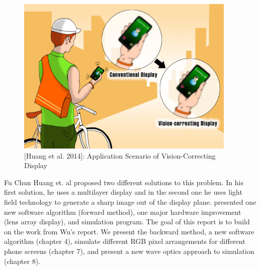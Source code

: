 \begin{figure}[ht]
  \centering
  \includegraphics[height=3in]{chapters/chapter1/images/phone.jpg}
  \caption{[Huang et al. 2014]: Application Scenario of Vision-Correcting Display}
  \label{fig:ferrari}
\end{figure}

Fu Chun Huang et. al proposed two different solutions to this problem. In his first solution, he uses a multilayer display and in the second one he uses light field technology to generate a sharp image out of the display plane.  \cite{Wu:EECS-2016-67} presented one new software algorithm (forward method), one major hardware improvement (lens array display), and simulation program. The goal of this report is to build on the work from Wu's report. We present the backward method, a new software algorithm (chapter 4), simulate different RGB pixel arrangements for different phone screens (chapter 7), and present a new wave optics approach to simulation (chapter 8).

